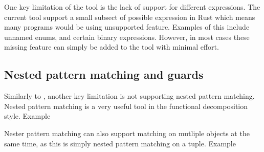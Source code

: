 \documentclass[ oneside,%
                    author={James Elgar},
                    degree={MEng},
                     title={Bidirectional transformer between functional and \\ object-oriented programming in Rust},
                  subtitle={}]{dissertation}
\begin{document}
One key limitation of the tool is the lack of support for different expressions. The current tool support a small subsect of possible expression in Rust which means many programs would be using unsupported feature. Examples of this include unnamed enums, and certain binary expressions. However, in most cases these missing feature can simply be added to the tool with minimal effort.

\subsection{Nested pattern matching and guards}

Similarly to \cite{food}, another key limitation is not supporting nested pattern matching. Nested pattern matching is a very useful tool in the functional decomposition style. Example

Nester pattern matching can also support matching on mutliple objects at the same time, as this is simply nested pattern matching on a tuple. Example 





\end{document}
